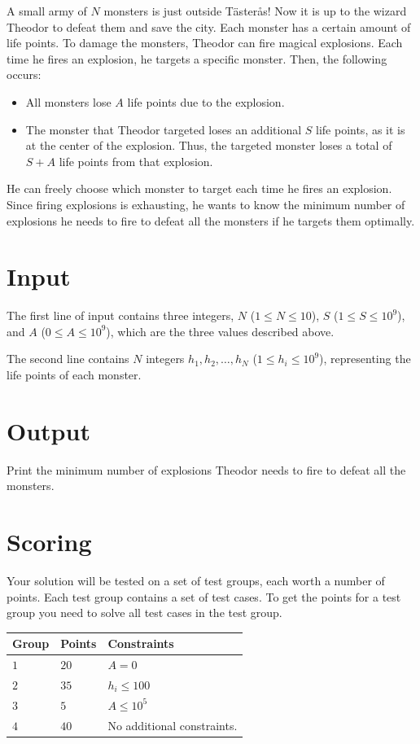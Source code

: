 
A small army of $N$ monsters is just outside Tästerås! Now it is up to the wizard Theodor to defeat
them and save the city. Each monster has a certain amount of life points. To damage the monsters,
Theodor can fire magical explosions. Each time he fires an explosion, he targets a specific monster.
Then, the following occurs:

\begin{itemize}
  \item All monsters lose $A$ life points due to the explosion.
  \item The monster that Theodor targeted loses an additional $S$ life points, as it is at the center of
  the explosion. Thus, the targeted monster loses a total of $S + A$ life points from that explosion.
\end{itemize}

He can freely choose which monster to target each time he fires an explosion. Since firing explosions
is exhausting, he wants to know the minimum number of explosions he needs to fire to defeat all the
monsters if he targets them optimally.

\section*{Input}  
The first line of input contains three integers, $N$ ($1 \leq N \leq 10$), $S$ ($1 \leq S \leq 10^9$),
and $A$ ($0 \leq A \leq 10^9$), which are the three values described above.  

The second line contains $N$ integers $h_1, h_2, \ldots, h_N$ ($1 \leq h_i \leq 10^9$), representing the
life points of each monster.  

\section*{Output}  
Print the minimum number of explosions Theodor needs to fire to defeat all the monsters.  

\section*{Scoring}
Your solution will be tested on a set of test groups, each worth a number of points. Each test group contains
a set of test cases. To get the points for a test group you need to solve all test cases in the test group.

\noindent
\begin{tabular}{| l | l | p{12cm} |}
  \hline
  \textbf{Group} & \textbf{Points} & \textbf{Constraints} \\ \hline
  $1$    & $20$       & $A = 0$ \\ \hline
  $2$    & $35$       & $h_i \leq 100$ \\ \hline
  $3$    & $5$        & $A \leq 10^5$ \\ \hline
  $4$    & $40$       & No additional constraints. \\ \hline
\end{tabular}

